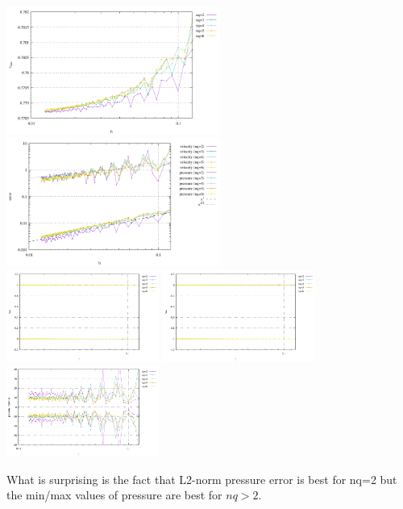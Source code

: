 \begin{center}
\includegraphics[width=7cm]{python_codes/fieldstone_80/results/solvi/vrms}
\includegraphics[width=7cm]{python_codes/fieldstone_80/results/solvi/errors}\\
\includegraphics[width=5cm]{python_codes/fieldstone_80/results/solvi/stats_u}
\includegraphics[width=5cm]{python_codes/fieldstone_80/results/solvi/stats_v}
\includegraphics[width=5cm]{python_codes/fieldstone_80/results/solvi/stats_p}\\
\end{center}

What is surprising is the fact that L2-norm pressure error is best for nq=2 but the min/max values of pressure
are best for $nq>2$.



